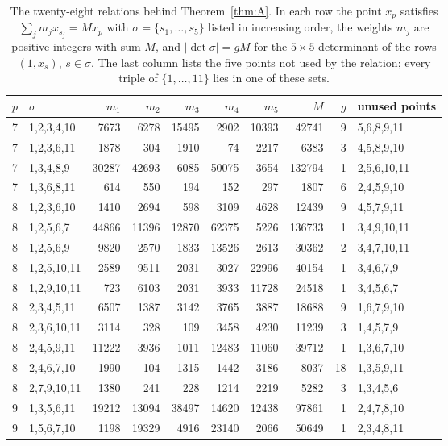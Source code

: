 \begin{table}[tp]
\caption{The twenty-eight relations behind Theorem~\ref{thm:A}. In each row the point $x_p$ satisfies $\sum_j m_j x_{s_j}=M x_p$ with $\sigma=\{s_1,\dots,s_5\}$ listed in increasing order, the weights $m_j$ are positive integers with sum $M$, and $|\det\sigma|=gM$ for the $5\times5$ determinant of the rows $(1,x_s)$, $s\in\sigma$. The last column lists the five points not used by the relation; every triple of $\{1,\dots,11\}$ lies in one of these sets.}\label{tab:certA}
\begin{ruledtabular}
\begin{tabular}{rlrrrrrrrl}
$p$ & $\sigma$ & $m_1$ & $m_2$ & $m_3$ & $m_4$ & $m_5$ & $M$ & $g$ & unused points \\ \hline
7 & 1,2,3,4,10 & 7673 & 6278 & 15495 & 2902 & 10393 & 42741 & 9 & 5,6,8,9,11 \\
7 & 1,2,3,6,11 & 1878 & 304 & 1910 & 74 & 2217 & 6383 & 3 & 4,5,8,9,10 \\
7 & 1,3,4,8,9 & 30287 & 42693 & 6085 & 50075 & 3654 & 132794 & 1 & 2,5,6,10,11 \\
7 & 1,3,6,8,11 & 614 & 550 & 194 & 152 & 297 & 1807 & 6 & 2,4,5,9,10 \\
8 & 1,2,3,6,10 & 1410 & 2694 & 598 & 3109 & 4628 & 12439 & 9 & 4,5,7,9,11 \\
8 & 1,2,5,6,7 & 44866 & 11396 & 12870 & 62375 & 5226 & 136733 & 1 & 3,4,9,10,11 \\
8 & 1,2,5,6,9 & 9820 & 2570 & 1833 & 13526 & 2613 & 30362 & 2 & 3,4,7,10,11 \\
8 & 1,2,5,10,11 & 2589 & 9511 & 2031 & 3027 & 22996 & 40154 & 1 & 3,4,6,7,9 \\
8 & 1,2,9,10,11 & 723 & 6103 & 2031 & 3933 & 11728 & 24518 & 1 & 3,4,5,6,7 \\
8 & 2,3,4,5,11 & 6507 & 1387 & 3142 & 3765 & 3887 & 18688 & 9 & 1,6,7,9,10 \\
8 & 2,3,6,10,11 & 3114 & 328 & 109 & 3458 & 4230 & 11239 & 3 & 1,4,5,7,9 \\
8 & 2,4,5,9,11 & 11222 & 3936 & 1011 & 12483 & 11060 & 39712 & 1 & 1,3,6,7,10 \\
8 & 2,4,6,7,10 & 1990 & 104 & 1315 & 1442 & 3186 & 8037 & 18 & 1,3,5,9,11 \\
8 & 2,7,9,10,11 & 1380 & 241 & 228 & 1214 & 2219 & 5282 & 3 & 1,3,4,5,6 \\
9 & 1,3,5,6,11 & 19212 & 13094 & 38497 & 14620 & 12438 & 97861 & 1 & 2,4,7,8,10 \\
9 & 1,5,6,7,10 & 1198 & 19329 & 4916 & 23140 & 2066 & 50649 & 1 & 2,3,4,8,11 \\

\end{tabular}
\end{ruledtabular}
\end{table}
